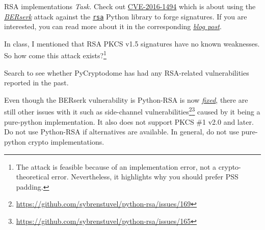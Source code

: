 \documentclass{practice}
\begin{document}
\begin{task}{RSA implementations}
  \textit{Task.}
  Check out \href{https://nvd.nist.gov/vuln/detail/CVE-2016-1494}{CVE-2016-1494} which is about using the \href{https://www.darkreading.com/cyberattacks-data-breaches/-berserk-bug-uncovered-in-mozilla-nss-crypto-library-impacts-firefox-chrome}{\textit{BERserk}} attack against the \href{https://github.com/sybrenstuvel/python-rsa}{\texttt{rsa}} Python library to forge signatures.
  If you are interested, you can read more about it in the corresponding \href{https://words.filippo.io/bleichenbacher-06-signature-forgery-in-python-rsa/}{\textit{blog post}}.

  In class, I mentioned that RSA PKCS v1.5 signatures have no known weaknesses.
  So how come this attack exists?\footnote{The attack is feasible because of an implementation error, not a crypto-theoretical error.
  Nevertheless, it highlights why you should prefer PSS padding.} 

  Search to see whether PyCryptodome has had any RSA-related vulnerabilities reported in the past.

  \begin{tcolorbox}[title=Warning]
    Even though the BERserk vulnerability is Python-RSA is now \href{https://github.com/sybrenstuvel/python-rsa/commit/ab5d21c3b554f926d51ff3ad9c794bcf32e95b3c}{\textit{fixed}}, there are still other issues with it such as side-channel vulnerabilities\footnote{\url{https://github.com/sybrenstuvel/python-rsa/issues/169}}\footnote{\url{https://github.com/sybrenstuvel/python-rsa/issues/165}} caused by it being a pure-python implementation.
    It also does not support PKCS \#1 v2.0 and later.
    \tcblower
    Do not use Python-RSA if alternatives are available.
    In general, do not use pure-python crypto implementations.
  \end{tcolorbox}
\end{task}

\newpage
\end{document}
